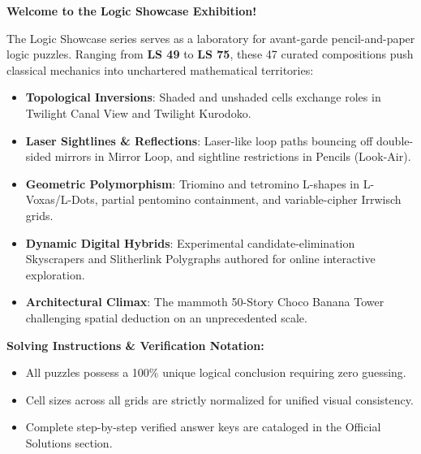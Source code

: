 \begin{tcolorbox}[
  colback=cbdarkteal!6!white,
  colframe=cbdarkteal,
  boxrule=0.8pt,
  arc=2mm,
  left=4mm, right=4mm, top=3mm, bottom=3mm
]
  \raggedright
  \textbf{\large Welcome to the Logic Showcase Exhibition!}
  \vspace{1.5mm}

  \normalsize
  The Logic Showcase series serves as a laboratory for avant-garde pencil-and-paper logic puzzles. Ranging from \textbf{LS 49} to \textbf{LS 75}, these 47 curated compositions push classical mechanics into unchartered mathematical territories:
  \begin{itemize}
    \setlength{\itemsep}{1.5pt}
    \item \textbf{Topological Inversions}: Shaded and unshaded cells exchange roles in Twilight Canal View and Twilight Kurodoko.
    \item \textbf{Laser Sightlines \& Reflections}: Laser-like loop paths bouncing off double-sided mirrors in Mirror Loop, and sightline restrictions in Pencils (Look-Air).
    \item \textbf{Geometric Polymorphism}: Triomino and tetromino L-shapes in L-Voxas/L-Dots, partial pentomino containment, and variable-cipher Irrwisch grids.
    \item \textbf{Dynamic Digital Hybrids}: Experimental candidate-elimination Skyscrapers and Slitherlink Polygraphs authored for online interactive exploration.
    \item \textbf{Architectural Climax}: The mammoth 50-Story Choco Banana Tower challenging spatial deduction on an unprecedented scale.
  \end{itemize}
\end{tcolorbox}

\vspace{3mm}

\begin{tcolorbox}[
  colback=white,
  colframe=cbdarkteal,
  boxrule=0.6pt,
  arc=1.5mm,
  left=3.5mm, right=3.5mm, top=2.5mm, bottom=2.5mm
]
  \raggedright
  \textbf{\footnotesize Solving Instructions \& Verification Notation:}
  \begin{itemize}
    \setlength{\itemsep}{1pt}
    \item All puzzles possess a 100\% unique logical conclusion requiring zero guessing.
    \item Cell sizes across all grids are strictly normalized for unified visual consistency.
    \item Complete step-by-step verified answer keys are cataloged in the Official Solutions section.
  \end{itemize}
\end{tcolorbox}

